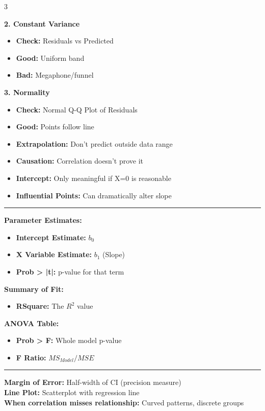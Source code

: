 \documentclass[7pt, letterpaper]{article}
\newcommand{\sectionhead}[1]{%
    \vspace{0.5mm}{\normalsize\bfseries#1}\vspace{0mm}\hrule\vspace{0.5mm}%
}
\begin{document}
\begin{multicols}{3}
\columnbreak

\textbf{2. Constant Variance}
\begin{itemize}
    \item \textbf{Check:} Residuals vs Predicted
    \item \textbf{Good:} Uniform band
    \item \textbf{Bad:} Megaphone/funnel
\end{itemize}
\textbf{3. Normality}
\begin{itemize}
    \item \textbf{Check:} Normal Q-Q Plot of Residuals
    \item \textbf{Good:} Points follow line
\end{itemize}

\begin{tcolorbox}[colback=red!5, colframe=black, boxrule=0.5pt, title=\textbf{Common Pitfalls}]
\begin{itemize}
    \item \textbf{Extrapolation:} Don't predict outside data range
    \item \textbf{Causation:} Correlation doesn't prove it
    \item \textbf{Intercept:} Only meaningful if X=0 is reasonable
    \item \textbf{Influential Points:} Can dramatically alter slope
\end{itemize}
\end{tcolorbox}

\sectionhead{JMP Regression Output}
\textbf{Parameter Estimates:}
\begin{itemize}
    \item \textbf{Intercept Estimate:} $b_0$
    \item \textbf{X Variable Estimate:} $b_1$ (Slope)
    \item \textbf{Prob > |t|:} p-value for that term
\end{itemize}
\textbf{Summary of Fit:}
\begin{itemize}
    \item \textbf{RSquare:} The $R^2$ value
\end{itemize}
\textbf{ANOVA Table:}
\begin{itemize}
    \item \textbf{Prob > F:} Whole model p-value
    \item \textbf{F Ratio:} $MS_{Model} / MSE$
\end{itemize}

\sectionhead{Quick Reference}
\textbf{Margin of Error:} Half-width of CI (precision measure) \\
\textbf{Line Plot:} Scatterplot with regression line \\
\textbf{When correlation misses relationship:} Curved patterns, discrete groups

\end{multicols}
\end{document}
